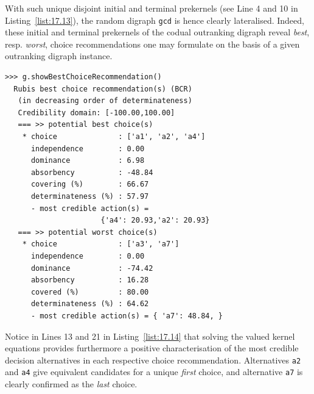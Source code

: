 With such unique disjoint initial and terminal prekernels (see Line 4 and 10 in Listing~\vref{list:17.13}), the random digraph \texttt{gcd} is hence clearly lateralised. Indeed, these initial and terminal prekernels of the codual outranking digraph reveal \emph{best}, resp. \emph{worst}, choice recommendations one may formulate on the basis of a given outranking digraph instance.
\begin{lstlisting}[caption={Computing a best and worst choice recommendation from digraph \texttt{gcd}},label=list:17.14]
>>> g.showBestChoiceRecommendation()
  Rubis best choice recommendation(s) (BCR)
   (in decreasing order of determinateness)   
   Credibility domain: [-100.00,100.00]
   === >> potential best choice(s)
    * choice              : ['a1', 'a2', 'a4']
      independence        : 0.00
      dominance           : 6.98
      absorbency          : -48.84
      covering (%)        : 66.67
      determinateness (%) : 57.97
      - most credible action(s) =
                      {'a4': 20.93,'a2': 20.93}
   === >> potential worst choice(s) 
    * choice              : ['a3', 'a7']
      independence        : 0.00
      dominance           : -74.42
      absorbency          : 16.28
      covered (%)         : 80.00
      determinateness (%) : 64.62
      - most credible action(s) = { 'a7': 48.84, }
\end{lstlisting}

Notice in Lines 13 and 21 in Listing~\vref{list:17.14} that solving the valued \Berge kernel equations provides furthermore a positive characterisation of the most credible decision alternatives in each respective choice recommendation. Alternatives \texttt{a2} and \texttt{a4} give equivalent candidates for a unique \emph{first} choice, and alternative \texttt{a7} is clearly confirmed as the \emph{last} choice.

